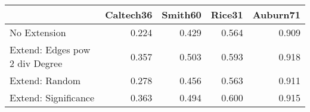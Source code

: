 \begin{tabular}{lrrrr}
\toprule
{} & Caltech36 & Smith60 & Rice31 & Auburn71 \\
\midrule
No Extension                   &     0.224 &   0.429 &  0.564 &    0.909 \\
Extend: Edges pow 2 div Degree &     0.357 &   0.503 &  0.593 &    0.918 \\
Extend: Random                 &     0.278 &   0.456 &  0.563 &    0.911 \\
Extend: Significance           &     0.363 &   0.494 &  0.600 &    0.915 \\
\bottomrule
\end{tabular}

